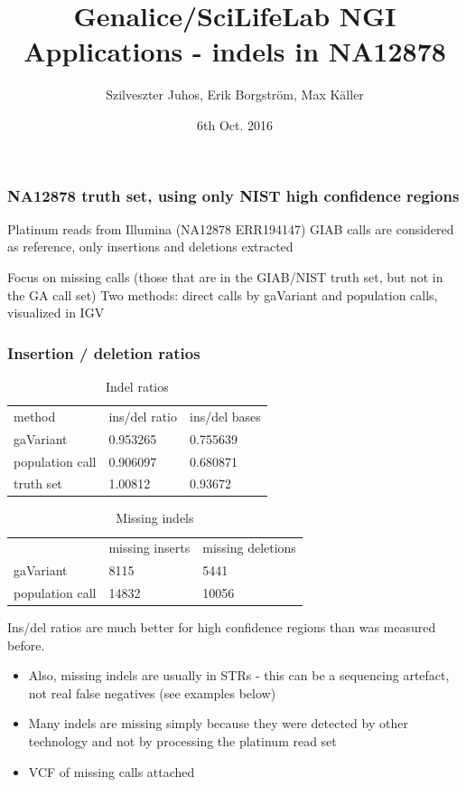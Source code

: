 \documentclass{beamer}
\title{Genalice/SciLifeLab NGI Applications - indels in NA12878 }
\author{Szilveszter Juhos, Erik Borgström, Max Käller}
\institute{SciLifeLab}
\date{6th Oct. 2016 }
\begin{document}
\frame{\titlepage}
			  
\begin{frame}
	\frametitle{NA12878 truth set, using only NIST high confidence regions}
	\begin{block}{Platinum reads from Illumina (NA12878 ERR194147) }
		GIAB calls are considered as reference, only insertions and deletions extracted
	\end{block}
	\begin{block}{Focus on missing calls (those that are in the GIAB/NIST truth set, but not in the GA call set)}
		Two methods: direct calls by gaVariant and population calls, visualized in IGV
	\end{block}
\end{frame}

\begin{frame}
	\frametitle{Insertion / deletion ratios}
	\begin{table}[]
		\centering
		\caption{Indel ratios}
		\label{indelratios}
		\begin{tabular}{lll}
			method          & ins/del ratio & ins/del bases \\
			gaVariant       & 0.953265      & 0.755639      \\
			population call & 0.906097      & 0.680871      \\
			truth set       & 1.00812       & 0.93672      
		\end{tabular}
	\end{table}

	\begin{table}[]
		\centering
		\caption{Missing indels}
		\label{missingindels}
		\begin{tabular}{lll}
										& missing inserts & missing deletions \\
										gaVariant       & 8115            & 5441              \\
										population call & 14832           & 10056            
		\end{tabular}
	\end{table}
\end{frame}

\begin{frame}
	\begin{block}{Ins/del ratios are much better for high confidence regions than was measured before.}
		\begin{itemize}
			\item Also, missing indels are usually in STRs - this can be a sequencing artefact, not real false negatives (see examples below)
			\item Many indels are missing simply because they were detected by other technology and not by processing the platinum read set
			\item VCF of missing calls attached
		\end{itemize}
	\end{block}
\end{frame}
\end{document}
